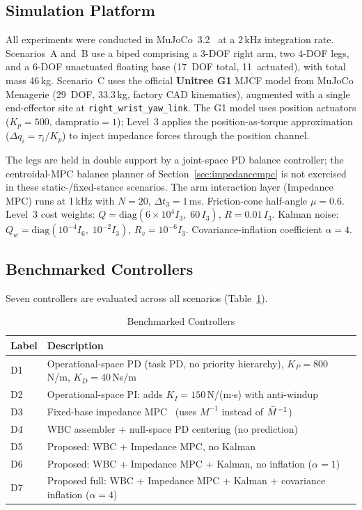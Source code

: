 \subsection{Simulation Platform}

All experiments were conducted in MuJoCo~3.2~\cite{todorov2012mujoco} at a
2\,kHz integration rate.
Scenarios~A and~B use a biped comprising a 3-DOF right arm, two 4-DOF legs,
and a 6-DOF unactuated floating base (17~DOF total, 11~actuated), with
total mass 46\,kg.
Scenario~C uses the official \textbf{Unitree G1} MJCF model from MuJoCo
Menagerie (29~DOF, 33.3\,kg, factory CAD kinematics), augmented with a
single end-effector site at \texttt{right\_wrist\_yaw\_link}.
The G1 model uses position actuators ($K_p=500$, $\text{dampratio}=1$);
Level~3 applies the position-as-torque approximation
($\Delta q_i=\tau_i/K_p$) to inject impedance forces through the position
channel.

The legs are held in double support by a joint-space PD balance controller;
the centroidal-MPC balance planner of Section~\ref{sec:impedancempc} is not
exercised in these static-/fixed-stance scenarios. The arm interaction layer
(Impedance MPC) runs at 1\,kHz with $N=20$, $\Delta t_3=1$\,ms.
Friction-cone half-angle $\mu=0.6$.
Level~3 cost weights: $Q=\mathrm{diag}(6\times10^4 I_3,\;60\,I_3)$,
$R=0.01\,I_3$.
Kalman noise: $Q_w=\mathrm{diag}(10^{-4}I_6,\;10^{-2}I_3)$,
$R_v=10^{-6}I_3$.
Covariance-inflation coefficient $\alpha=4$.

\subsection{Benchmarked Controllers}

Seven controllers are evaluated across all scenarios (Table~\ref{tab:controllers}).

\begin{table}[!t]
\caption{Benchmarked Controllers}
\label{tab:controllers}
\renewcommand{\arraystretch}{1.2}
\begin{tabular}{lp{6cm}}
\toprule
\textbf{Label} & \textbf{Description} \\
\midrule
D1 & Operational-space PD (task PD, no priority hierarchy), $K_P=800$\,N/m, $K_D=40$\,Ns/m \\
D2 & Operational-space PI: adds $K_I=150$\,N/(m$\cdot$s) with anti-windup \\
D3 & Fixed-base impedance MPC~\cite{cao2026impedance} (uses $M^{-1}$ instead of $\bar{M}^{-1}$) \\
D4 & WBC assembler + null-space PD centering (no prediction) \\
D5 & Proposed: WBC + Impedance MPC, no Kalman \\
D6 & Proposed: WBC + Impedance MPC + Kalman, no inflation ($\alpha=1$) \\
D7 & Proposed full: WBC + Impedance MPC + Kalman + covariance inflation ($\alpha=4$) \\
\bottomrule
\end{tabular}
\end{table}

